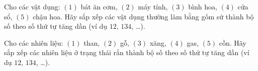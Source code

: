 \documentclass[Main.tex]{subfiles}
\begin{document}
\begin{ex}%
	Cho các vật dụng: $(1)$ bát ăn cơm, $(2)$ máy tính, $(3)$ bình hoa, $(4)$ cửa sổ, $(5)$ chậu hoa. Hãy sắp xếp các vật dụng thường làm bằng gốm sứ thành bộ số theo số thứ tự tăng dần (ví dụ $12$, $134$, …).
\end{ex}

\begin{ex}%
	Cho các nhiên liệu: $(1)$ than, $(2)$ gỗ, $(3)$ xăng, $(4)$ gas, $(5)$ cồn. Hãy sắp xếp các nhiên liệu ở trạng thái rắn thành bộ số theo số thứ tự tăng dần (ví dụ $12$, $134$, …).
\end{ex}
\end{document}
